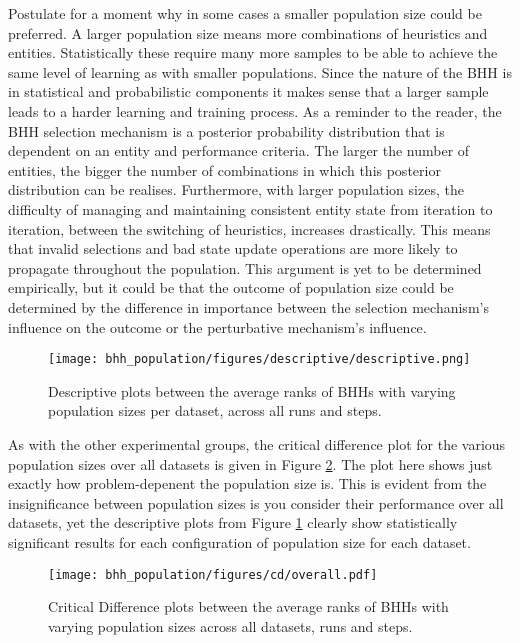 Postulate for a moment why in some cases a smaller population size could be preferred. A larger population size means more combinations of heuristics and entities. Statistically these require many more samples to be able to achieve the same level of learning as with smaller populations. Since the nature of the \Ac{BHH} is in statistical and probabilistic components it makes sense that a larger sample leads to a harder learning and training process. As a reminder to the reader, the \ac{BHH} selection mechanism is a posterior probability distribution that is dependent on an entity and performance criteria. The larger the number of entities, the bigger the number of combinations in which this posterior distribution can be realises. Furthermore, with larger population sizes, the difficulty of managing and maintaining consistent entity state from iteration to iteration, between the switching of heuristics, increases drastically. This means that invalid selections and bad state update operations are more likely to propagate throughout the population. This argument is yet to be determined empirically, but it could be that the outcome of population size could be determined by the difference in importance between the selection mechanism's influence on the outcome or the perturbative mechanism's influence.


\begin{figure}[htbp]
      \centering
      \texttt{[image: bhh\_population/figures/descriptive/descriptive.png]}
      \caption{Descriptive plots between the average ranks of \Acsp{BHH} with varying population sizes per dataset, across all runs and steps.}
      \label{fig:results:population:descriptive:descriptive}
\end{figure}

As with the other experimental groups, the critical difference plot for the various population sizes over all datasets is given in Figure \ref{fig:results:population:descriptive:cd}. The plot here shows just exactly how problem-depenent the population size is. This is evident from the insignificance between population sizes is you consider their performance over all datasets, yet the descriptive plots from Figure \ref{fig:results:population:descriptive:descriptive} clearly show statistically significant results for each configuration of population size for each dataset.

\begin{figure}[htbp]
      \centering
      \texttt{[image: bhh\_population/figures/cd/overall.pdf]}
      \caption{Critical Difference plots between the average ranks of \Acsp{BHH} with varying population sizes across all datasets, runs and steps.}
      \label{fig:results:population:descriptive:cd}
\end{figure}

